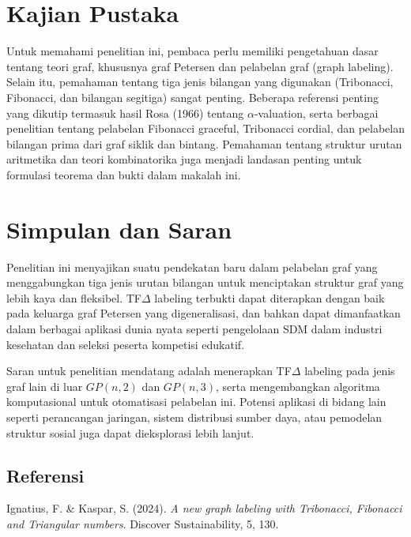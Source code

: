 \documentclass[12pt]{article}
\begin{document}
\section{Kajian Pustaka}
Untuk memahami penelitian ini, pembaca perlu memiliki pengetahuan dasar tentang teori graf, khususnya graf Petersen dan pelabelan graf (graph labeling). Selain itu, pemahaman tentang tiga jenis bilangan yang digunakan (Tribonacci, Fibonacci, dan bilangan segitiga) sangat penting. Beberapa referensi penting yang dikutip termasuk hasil Rosa (1966) tentang $\alpha$-valuation, serta berbagai penelitian tentang pelabelan Fibonacci graceful, Tribonacci cordial, dan pelabelan bilangan prima dari graf siklik dan bintang. Pemahaman tentang struktur urutan aritmetika dan teori kombinatorika juga menjadi landasan penting untuk formulasi teorema dan bukti dalam makalah ini.

\section{Simpulan dan Saran}
Penelitian ini menyajikan suatu pendekatan baru dalam pelabelan graf yang menggabungkan tiga jenis urutan bilangan untuk menciptakan struktur graf yang lebih kaya dan fleksibel. TF$\Delta$ labeling terbukti dapat diterapkan dengan baik pada keluarga graf Petersen yang digeneralisasi, dan bahkan dapat dimanfaatkan dalam berbagai aplikasi dunia nyata seperti pengelolaan SDM dalam industri kesehatan dan seleksi peserta kompetisi edukatif.

Saran untuk penelitian mendatang adalah menerapkan TF$\Delta$ labeling pada jenis graf lain di luar $GP(n,2)$ dan $GP(n,3)$, serta mengembangkan algoritma komputasional untuk otomatisasi pelabelan ini. Potensi aplikasi di bidang lain seperti perancangan jaringan, sistem distribusi sumber daya, atau pemodelan struktur sosial juga dapat dieksplorasi lebih lanjut.

\subsection*{Referensi}
Ignatius, F. \& Kaspar, S. (2024). \textit{A new graph labeling with Tribonacci, Fibonacci and Triangular numbers}. Discover Sustainability, 5, 130.
\end{document}
